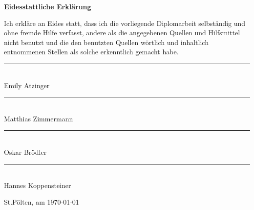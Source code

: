\begin{flushleft}
\Large
\textbf{Eidesstattliche Erklärung\\}
\vspace{1.5cm}
\end{flushleft}


Ich erkläre an Eides statt, dass ich die vorliegende Diplomarbeit selbständig und ohne fremde Hilfe verfasst, andere als die angegebenen Quellen
und Hilfsmittel nicht benutzt und die den benutzten Quellen wörtlich und inhaltlich entnommenen Stellen als solche erkenntlich gemacht habe.

\begin{center}
    \vspace{1.5cm}
	\rule{200pt}{1pt} \\
	Emily Atzinger

    \vspace{1.5cm}
    \rule{200pt}{1pt} \\
    Matthias Zimmermann
	
	\vspace{1.5cm}
	\rule{200pt}{1pt} \\
	Oskar Brödler

    \vspace{1.5cm}
    \rule{200pt}{1pt} \\
    Hannes Koppensteiner
\end{center}

\vspace{1.5cm}

St.Pölten, am \today
